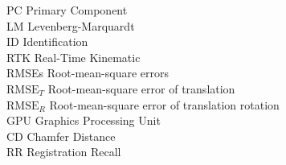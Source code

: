 \begin{tabbing}
PC \> Primary Component\\

LM \> Levenberg-Marquardt\\

ID \> Identification\\
RTK \> Real-Time Kinematic\\
RMSEs \> Root-mean-square errors\\

$\mathrm{RMSE}_{T}$ \> Root-mean-square error of translation\\

$\mathrm{RMSE}_{R}$ \> Root-mean-square error of translation rotation\\

GPU \> Graphics Processing Unit\\

CD \> Chamfer Distance\\

RR \> Registration Recall\\


 
\end{tabbing}
